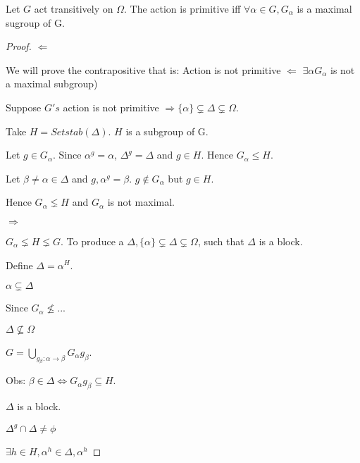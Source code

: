 \begin{lemma}
Let $G$ act transitively on $\Omega$. The action is primitive iff $\forall \alpha \in G, G_\alpha$ is a maximal sugroup of G. 
\end{lemma}

\begin{proof}
$\Leftarrow$ 

We will prove the contrapositive that is: Action is not primitive $\Leftarrow$ $\exists \alpha G_\alpha$ is not a maximal subgroup)

Suppose $G's$ action is not primitive $\Rightarrow \{\alpha\} \subsetneq \Delta \subsetneq \Omega$. 

Take $H = Setstab(\Delta)$. $H$ is a subgroup of G.

Let $g \in G_\alpha$. Since $\alpha^g = \alpha$, $\Delta^g = \Delta$ and $g \in H$. Hence $G_\alpha \leq H$.

Let $\beta \neq \alpha \in \Delta$ and $g, \alpha^g = \beta$. $g \notin G_\alpha$ but $g \in H$. 

Hence $G_\alpha \lneq H$ and $G_\alpha$ is not maximal. 

$\Rightarrow$

$G_\alpha \lneq H \lneq G$. To produce a $\Delta,\{\alpha\} \subsetneq \Delta \subsetneq \Omega$, such that $\Delta$ is a block.

Define $\Delta = \alpha^H$. 

$\alpha \subsetneq \Delta$

Since $G_\alpha \not \leq $...

$\Delta \not \subseteq \Omega$

$G = \bigcup_{g_\beta :\alpha \rightarrow \beta } G_\alpha g_\beta $.

Obs: $\beta \in \Delta \Leftrightarrow G_\alpha g_\beta \subseteq H$.

$\Delta$ is a block.

$\Delta ^g \cap \Delta \neq \phi$

$\exists h \in H,\alpha ^h \in \Delta ,\alpha^h$

\end{proof}


